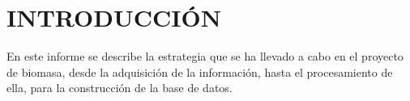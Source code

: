 \chapter*{INTRODUCCIÓN}
 
En este informe se describe la estrategia que se ha llevado a cabo en el proyecto de biomasa,
desde la adquisición de la información, hasta el procesamiento de ella, para la construcción
de la base de datos.

